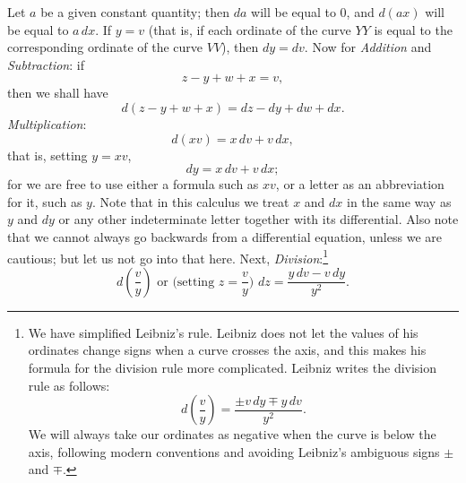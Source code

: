 \documentclass[polutonikogreek,english,twoside,openright]{article}
\begin{document}
Let $a$ be a given constant quantity; then $da$ will be equal to 0,
and $d(ax)$ will be equal to $a\,dx$. If $y = v$ (that is, if each ordinate of the
curve $YY$ is equal to the corresponding ordinate of the curve $VV$),
then $dy = dv$.  \newline Now for {\em Addition} and {\em
  Subtraction}: if
$$z-y+w+x = v,$$ then we shall have $$d(z-y+w+x) = dz-dy +dw + dx.$$ \newline
{\em Multiplication}:
$$d(xv) = x\,dv + v\,dx,$$ that is, setting $y = xv$,
$$dy = x\,dv + v\,dx;$$ for we are free to use either
a formula such as $xv$, or a letter as an abbreviation for it, such as
$y$. Note that in this calculus we treat $x$ and $dx$ in the same way
as $y$ and $dy$ or any other indeterminate letter together with its
differential.  Also note that we cannot always go backwards from a
differential equation, unless we are cautious; but let us not go into
that here. \newline Next, {\em Division}:\footnote{We have simplified
  Leibniz's rule.  Leibniz does not let the values of his ordinates
  change signs when a curve crosses the axis, and this makes his
  formula for the division rule more complicated.  Leibniz writes the
  division rule as follows:
$$d\left(\frac{v}{y}\right) = 
\frac{\pm v\,dy \mp y\,dv}{y^2}.$$ We will always take our ordinates
as negative when the curve is below the axis, following modern
conventions and avoiding Leibniz's ambiguous signs $\pm$ and $\mp$.}
$$d\left(\frac{v}{y}\right) \mbox{ or (setting $z = \frac{v}{y}$) }dz =
\frac{y\,dv - v\,dy }{y^2}.$$
\end{document}
